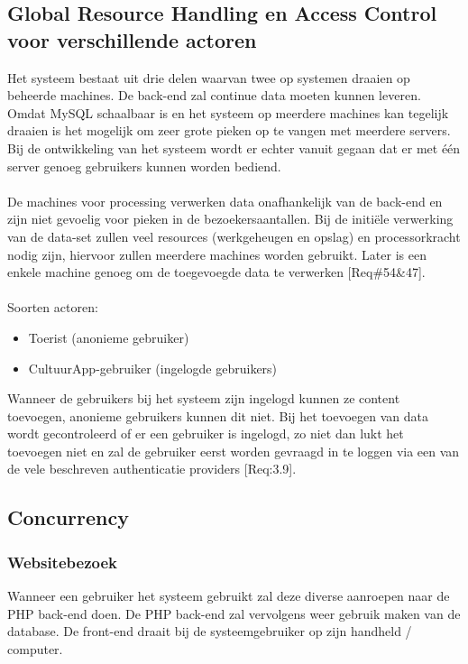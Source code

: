 \documentclass[a4paper,10pt]{article}
\begin{document}
	\subsection{Global Resource Handling en Access Control voor verschillende actoren}
	Het systeem bestaat uit drie delen waarvan twee op systemen draaien op beheerde machines. De back-end zal continue data moeten kunnen leveren. Omdat MySQL schaalbaar is en het systeem op meerdere machines kan tegelijk draaien is het mogelijk om zeer grote pieken op te vangen met meerdere servers. Bij de ontwikkeling van het systeem wordt er echter vanuit gegaan dat er met \'e\'en server genoeg gebruikers kunnen worden bediend.\\ \\
De machines voor processing verwerken data onafhankelijk van de back-end en zijn niet gevoelig voor pieken in de bezoekersaantallen. Bij de initi\"ele verwerking van de data-set zullen veel resources (werkgeheugen en opslag) en processorkracht nodig zijn, hiervoor zullen meerdere machines worden gebruikt. Later is een enkele machine genoeg om de toegevoegde data te verwerken [Req\#54\&47].\\ \\
Soorten actoren:
	\begin{itemize}
		\item Toerist (anonieme gebruiker)
		\item CultuurApp-gebruiker (ingelogde gebruikers)
	\end{itemize}

Wanneer de gebruikers bij het systeem zijn ingelogd kunnen ze content toevoegen, anonieme gebruikers kunnen dit niet. Bij het toevoegen van data wordt gecontroleerd of er een gebruiker is ingelogd, zo niet dan lukt het toevoegen niet en zal de gebruiker eerst worden gevraagd in te loggen via een van de vele beschreven authenticatie providers [Req:3.9].

	\subsection{Concurrency}
		\subsubsection{Websitebezoek}
		Wanneer een gebruiker het systeem gebruikt zal deze diverse aanroepen naar de PHP back-end doen. De PHP back-end zal vervolgens weer gebruik maken van de database. De front-end draait bij de systeemgebruiker op zijn handheld / computer.
		
\end{document}
